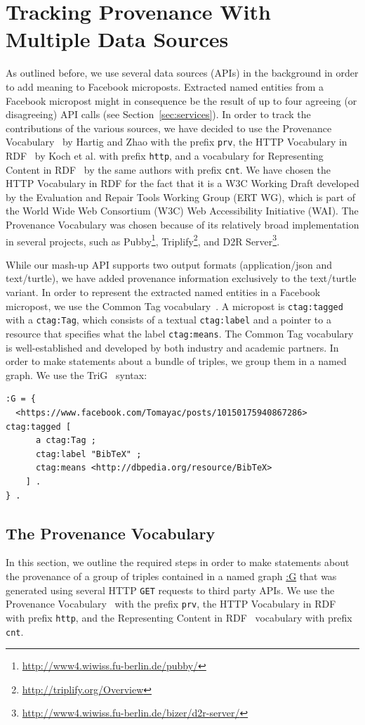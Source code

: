 \documentclass[conference]{IEEEtran}
\begin{document}
\section{Tracking Provenance With Multiple Data Sources}                    \label{sec:tracking}
As outlined before, we use several data sources (APIs) in the background in order to add meaning to Facebook microposts. Extracted named entities from a Facebook micropost might in consequence be the result of up to four agreeing (or disagreeing) API calls (see Section~\ref{sec:services}). In order to track the contributions of the various sources, we have decided to use the Provenance Vocabulary~\cite{Hartig:Provenance} by Hartig and Zhao with the prefix \texttt{prv}, the HTTP Vocabulary in RDF~\cite{HTTP:RDF} by Koch et al. with prefix \texttt{http}, and a vocabulary for Representing Content in RDF~\cite{CNT:RDF} by the same authors with prefix \texttt{cnt}. We have chosen the HTTP Vocabulary in RDF for the fact that it is a W3C Working Draft  developed by the Evaluation and Repair Tools Working Group (ERT WG), which is part of the World Wide Web Consortium (W3C) Web Accessibility Initiative (WAI). The Provenance Vocabulary was chosen because of its relatively broad implementation in several projects, such as Pubby\footnote{\url{http://www4.wiwiss.fu-berlin.de/pubby/}}, Triplify\footnote{\url{http://triplify.org/Overview}}, and D2R Server\footnote{\url{http://www4.wiwiss.fu-berlin.de/bizer/d2r-server/}}.

While our mash-up API supports two output formats (application/json and text/turtle), we have added provenance information exclusively to the text/turtle variant. In order to represent the extracted named entities in a Facebook micropost, we use the Common Tag vocabulary~\cite{CommonTag:Spec}. A micropost is \texttt{ctag:tagged} with a \texttt{ctag:Tag}, which consists of a textual \texttt{ctag:label} and a pointer to a resource that specifies what the label \texttt{ctag:means}. The Common Tag vocabulary is well-established and developed by both industry and academic partners. In order to make statements about a bundle of triples, we group them in a named graph. We use the TriG~\cite{Bizer:TriG} syntax:
\begin{lstlisting}
:G = {
  <https://www.facebook.com/Tomayac/posts/10150175940867286> ctag:tagged [
      a ctag:Tag ;
      ctag:label "BibTeX" ;
      ctag:means <http://dbpedia.org/resource/BibTeX>
    ] .
} .
\end{lstlisting}

\subsection{The Provenance Vocabulary}                                      \label{sec:provenance}
In this section, we outline the required steps in order to make statements about the provenance of a group of triples contained in a named graph \url{:G} that was generated using several HTTP \texttt{GET} requests to third party APIs. We use the Provenance Vocabulary~\cite{Hartig:Provenance} with the prefix \texttt{prv}, the HTTP Vocabulary in RDF~\cite{HTTP:RDF} with prefix \texttt{http}, and the Representing Content in RDF~\cite{CNT:RDF} vocabulary with prefix \texttt{cnt}.
\end{document}

